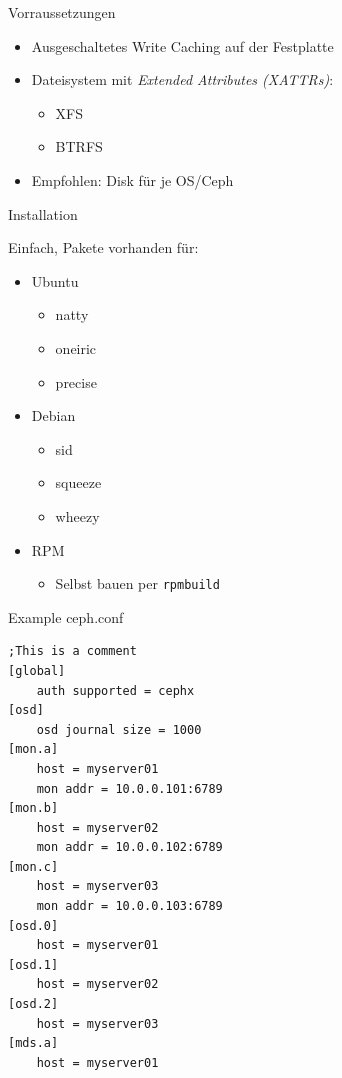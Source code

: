 \documentclass[notes=hide,yellow]{beamer}
\begin{document}
\begin{frame}{Vorraussetzungen}
	\begin{itemize}
		\item Ausgeschaltetes Write Caching auf der Festplatte
		\item Dateisystem mit \emph{Extended Attributes (XATTRs)}:
		\begin{itemize}
			\item XFS
			\item BTRFS
		\end{itemize}
		\item Empfohlen: Disk f\"ur je OS/Ceph

	\end{itemize}
\end{frame}



\begin{frame}{Installation}

	Einfach, Pakete vorhanden f\"ur:
	\begin{itemize}
		\item Ubuntu
		\begin{itemize}
			\item natty
			\item oneiric
			\item precise
		\end{itemize}
		\item Debian
		\begin{itemize}
			\item sid
			\item squeeze
			\item wheezy
		\end{itemize}
		\item RPM 
		\begin{itemize}
			\item Selbst bauen per \texttt{rpmbuild}
		\end{itemize}
	\end{itemize}

\end{frame}


\begin{frame}[fragile]{Example ceph.conf}

\begin{lstlisting}
;This is a comment
[global]
	auth supported = cephx
[osd]
	osd journal size = 1000
[mon.a]
	host = myserver01
	mon addr = 10.0.0.101:6789
[mon.b]
	host = myserver02
	mon addr = 10.0.0.102:6789
[mon.c]
	host = myserver03
	mon addr = 10.0.0.103:6789
[osd.0]
	host = myserver01
[osd.1]
	host = myserver02
[osd.2]
	host = myserver03
[mds.a]
	host = myserver01
\end{lstlisting}
\end{frame}
\end{document}

